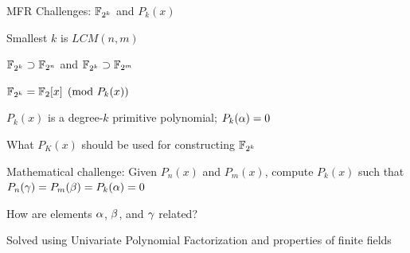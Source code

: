 \begin{frame}{\large MFR Challenges: ${\mathbb{F}}_{2^k}$ and $P_k(x)$}
\bi
	\item Smallest $k$ is $LCM(n,m)$
	\bi
		\vspace{0.1in}
		\item ${\mathbb{F}}_{2^k} \supset {\mathbb{F}}_{2^n}$ and ${\mathbb{F}}_{2^k} \supset {\mathbb{F}}_{2^m}$
		\vspace{0.1in}
		\item ${\mathbb{F}}_{2^k} = {\mathbb{F}}_{2}[x]\pmod{P_k(x)}$
		\bi
			\item $P_k(x)$ is a degree-$k$ primitive polynomial; $P_k(\alpha) =0$ 
		\ei
	\ei
	\pause
	\vspace{0.1in}

	\item What $P_K(x)$ should be used for constructing ${\mathbb{F}}_{2^k}$
	\vspace{0.1in}
	\pause
	\item  Mathematical challenge: Given $P_n(x)$ and $P_m(x)$, compute $P_k(x)$ such that
	$P_n(\gamma)= P_m(\beta)=P_k(\alpha)=0$
	\pause
	\bi
		\item How are elements $\alpha$, $\beta$, and $\gamma$ related?
	\ei
	\pause
	\item Solved using Univariate Polynomial Factorization and properties of finite fields
	\vspace{0.1in}
\ei

\end{frame}


